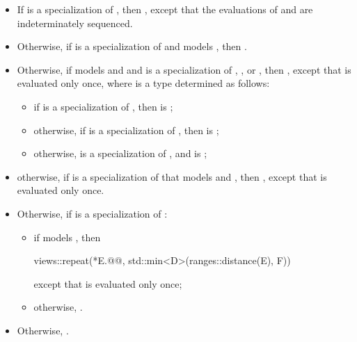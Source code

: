 \begin{itemize}
\item
If  is a specialization
of ,
then ,
except that the evaluations of  and 
are indeterminately sequenced.

\item
Otherwise, if  is a specialization of
 and  models , then
.

\item
Otherwise, if  models
 and 
and is a specialization of
,
, or
,
then
,
except that  is evaluated only once,
where  is a type determined as follows:

\begin{itemize}
\item if  is a specialization of ,
then  is ;
\item otherwise, if  is a specialization of ,
then  is ;
\item otherwise,  is a specialization of , and
 is ;
\end{itemize}

\item
otherwise, if  is
a specialization of 
that models  and ,
then
,
except that  is evaluated only once.

\item
Otherwise, if  is
a specialization of :
\begin{itemize}
\item
if  models ,
then
\begin{codeblock}
views::repeat(*E.@@, std::min<D>(ranges::distance(E), F))
\end{codeblock}
except that  is evaluated only once;
\item
otherwise, .
\end{itemize}

\item
Otherwise, .
\end{itemize}

